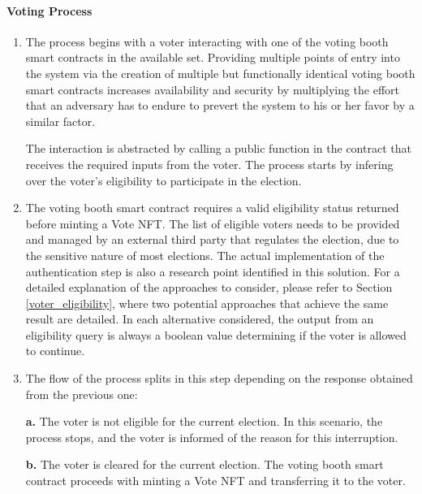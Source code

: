 \documentclass[../main.tex]{subfiles}
\begin{document}
\paragraph{Voting Process}
\begin{enumerate}
    \item{The process begins with a voter interacting with one of the voting booth smart contracts in the available set. Providing multiple points of entry into the system via the creation of multiple but functionally identical voting booth smart contracts increases availability and security by multiplying the effort that an adversary has to endure to prevert the system to his or her favor by a similar factor.
          \par
          The interaction is abstracted by calling a public function in the contract that receives the required inputs from the voter. The process starts by infering over the voter's eligibility to participate in the election.}

    \item{The voting booth smart contract requires a valid eligibility status returned before minting a Vote NFT. The list of eligible voters needs to be provided and managed by an external third party that regulates the election, due to the sensitive nature of most elections. The actual implementation of the authentication step is also a research point identified in this solution. For a detailed explanation of the approaches to consider, please refer to Section \ref{voter_eligibility}, where two potential approaches that achieve the same result are detailed. In each alternative considered, the output from an eligibility query is always a boolean value determining if the voter is allowed to continue.}

    \item{The flow of the process splits in this step depending on the response obtained from the previous one:
          \par
          \textbf{a.} The voter is not eligible for the current election. In this scenario, the process stops, and the voter is informed of the reason for this interruption.
          \par
          \textbf{b.} The voter is cleared for the current election. The voting booth smart contract proceeds with minting a Vote NFT and transferring it to the voter.}


\end{enumerate}
\end{document}
